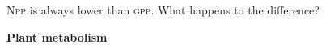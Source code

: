 \showpoints

\question[5]
\textsc{Npp} is always lower than \textsc{gpp}. What happens to the difference?


\ifprintanswers\medskip\textbf{Plant metabolism}\fi

